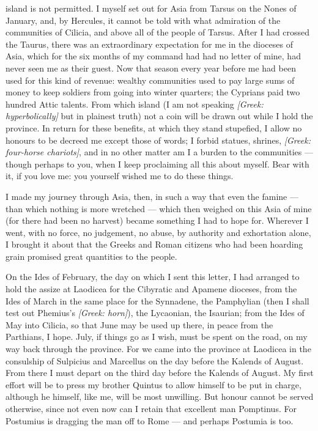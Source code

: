  island is not permitted. I myself set out for Asia from Tarsus on the Nones of January, and, by Hercules, it cannot be told with what admiration of the communities of Cilicia, and above all of the people of Tarsus. After I had crossed the Taurus, there was an extraordinary expectation for me in the dioceses of Asia, which for the six months of my command had had no letter of mine, had never seen me as their guest. Now that season every year before me had been used for this kind of revenue: wealthy communities used to pay large sums of money to keep soldiers from going into winter quarters; the Cyprians paid two hundred Attic talents. From which island (I am not speaking \textit{[Greek: hyperbolically]} but in plainest truth) not a coin will be drawn out while I hold the province. In return for these benefits, at which they stand stupefied, I allow no honours to be decreed me except those of words; I forbid statues, shrines, \textit{[Greek: four-horse chariots]}, and in no other matter am I a burden to the communities --- though perhaps to you, when I keep proclaiming all this about myself. Bear with it, if you love me: you yourself wished me to do these things.

 I made my journey through Asia, then, in such a way that even the famine --- than which nothing is more wretched --- which then weighed on this Asia of mine (for there had been no harvest) became something I had to hope for. Wherever I went, with no force, no judgement, no abuse, by authority and exhortation alone, I brought it about that the Greeks and Roman citizens who had been hoarding grain promised great quantities to the people.

 On the Ides of February, the day on which I sent this letter, I had arranged to hold the assize at Laodicea for the Cibyratic and Apamene dioceses, from the Ides of March in the same place for the Synnadene, the Pamphylian (then I shall test out Phemius's \textit{[Greek: horn]}), the Lycaonian, the Isaurian; from the Ides of May into Cilicia, so that June may be used up there, in peace from the Parthians, I hope. July, if things go as I wish, must be spent on the road, on my way back through the province. For we came into the province at Laodicea in the consulship of Sulpicius and Marcellus on the day before the Kalends of August. From there I must depart on the third day before the Kalends of August. My first effort will be to press my brother Quintus to allow himself to be put in charge, although he himself, like me, will be most unwilling. But honour cannot be served otherwise, since not even now can I retain that excellent man Pomptinus. For Postumius is dragging the man off to Rome --- and perhaps Postumia is too.

